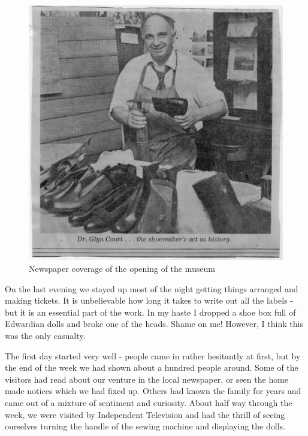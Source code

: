 \begin{figure}[]
     \includegraphics[width=1\textwidth]{figures/Museum}
     \caption{Newspaper coverage of the opening of the museum}
     \label{fig:Museum}
\end{figure}

On the last evening we stayed up most of the night getting things arranged and making tickets. It is unbelievable how long it takes to write out all the labels - but it is an essential part of the work. In my haste I dropped a shoe box full of Edwardian dolls and broke one of the heads. Shame on me! However, I think this was the only casualty.

The first day started very well - people came in rather hesitantly at first, but by the end of the week we had shown about a hundred people around. Some of the visitors had read about our venture in the local newspaper, or seen the home made notices which we had fixed up. Others had known the family for years and came out of a mixture of sentiment and curiosity. About half way through the week, we were visited by Independent Television and had the thrill of seeing ourselves turning the handle of the sewing machine and displaying the dolls.

